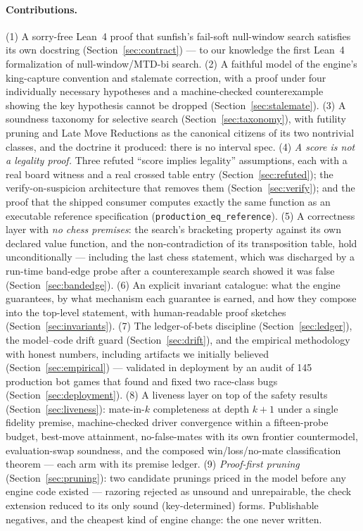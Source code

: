 \documentclass[11pt]{article}
\theoremstyle{plain}
\theoremstyle{definition}
\theoremstyle{remark}
\begin{document}
\paragraph{Contributions.}
(1) A sorry-free Lean~4 proof that sunfish's fail-soft null-window
search satisfies its own docstring (Section~\ref{sec:contract}) --- to
our knowledge the first Lean~4 formalization of null-window/MTD-bi
search.
(2) A faithful model of the engine's king-capture convention and
stalemate correction, with a proof under four individually necessary
hypotheses and a machine-checked counterexample showing the key
hypothesis cannot be dropped (Section~\ref{sec:stalemate}).
(3) A soundness taxonomy for selective search
(Section~\ref{sec:taxonomy}), with futility pruning and Late Move
Reductions as the canonical citizens of its two nontrivial classes,
and the doctrine it produced: there is no interval spec.
(4) \emph{A score is not a legality proof.}  Three refuted
``score implies legality'' assumptions, each with a real board witness
and a real crossed table entry (Section~\ref{sec:refuted}); the
verify-on-suspicion architecture that removes them
(Section~\ref{sec:verify}); and the proof that the shipped consumer
computes exactly the same function as an executable reference
specification (\texttt{production\_eq\_reference}).
(5) A correctness layer with \emph{no chess premises}: the search's
bracketing property against its own declared value function, and the
non-contradiction of its transposition table, hold unconditionally ---
including the last chess statement, which was discharged by a run-time
band-edge probe after a counterexample search showed it was false
(Section~\ref{sec:bandedge}).
(6) An explicit invariant catalogue: what the engine guarantees, by
what mechanism each guarantee is earned, and how they compose into the
top-level statement, with human-readable proof sketches
(Section~\ref{sec:invariants}).
(7) The ledger-of-bets discipline (Section~\ref{sec:ledger}), the
model--code drift guard (Section~\ref{sec:drift}), and the empirical
methodology with honest numbers, including artifacts we initially
believed (Section~\ref{sec:empirical}) --- validated in deployment by
an audit of 145 production bot games that found and fixed two
race-class bugs (Section~\ref{sec:deployment}).
(8) A liveness layer on top of the safety results
(Section~\ref{sec:liveness}): mate-in-$k$ completeness at depth $k+1$
under a single fidelity premise, machine-checked driver convergence
within a fifteen-probe budget, best-move attainment, no-false-mates
with its own frontier countermodel, evaluation-swap soundness, and the
composed win/loss/no-mate classification theorem --- each arm with its
premise ledger.
(9) \emph{Proof-first pruning} (Section~\ref{sec:pruning}): two
candidate prunings priced in the model before any engine code existed
--- razoring rejected as unsound and unrepairable, the check extension
reduced to its only sound (key-determined) forms.  Publishable
negatives, and the cheapest kind of engine change: the one never
written.
\end{document}

